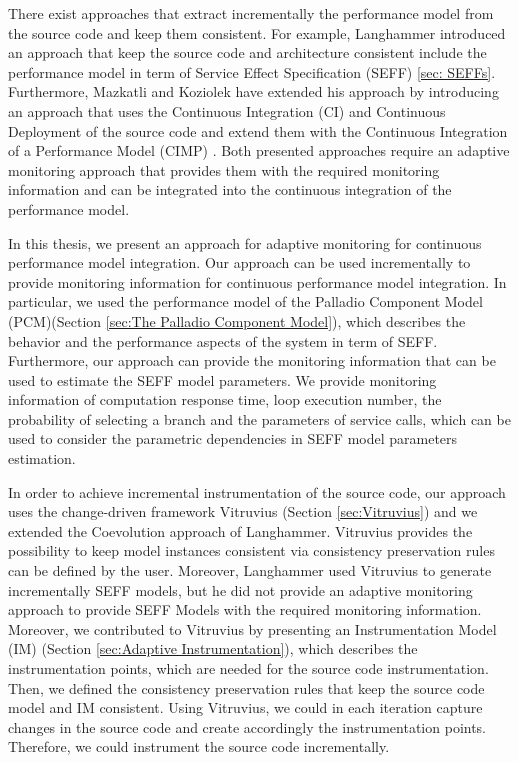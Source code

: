 There exist approaches that extract incrementally the performance model from the source code and keep them consistent. For example, Langhammer introduced an approach \cite{langhammer2017automated} that keep the source code and architecture consistent include the performance model in term of Service Effect Specification (SEFF) \ref{sec: SEFFs}. Furthermore, Mazkatli and Koziolek have extended his approach by introducing an approach that uses the Continuous Integration (CI) and Continuous Deployment of the source code and extend them with the Continuous Integration of a Performance Model (CIMP) \cite{mazkatli2018continuous}. Both presented approaches require an adaptive monitoring approach that provides them with the required monitoring information and can be integrated into the continuous integration of the performance model. 

In this thesis, we present an approach for adaptive monitoring for continuous performance model integration. Our approach can be used incrementally to provide monitoring information for continuous performance model integration. In particular, we used the performance model of the Palladio Component Model (PCM)(Section \ref{sec:The Palladio Component Model}), which describes the behavior and the performance aspects of the system in term of SEFF. Furthermore, our approach can provide the monitoring information that can be used to estimate the SEFF model parameters. We provide monitoring information of computation response time, loop execution number, the probability of selecting a branch and the parameters of service calls, which can be used to consider the parametric dependencies in SEFF model parameters estimation.

In order to achieve incremental instrumentation of the source code, our approach uses the change-driven framework Vitruvius (Section \ref{sec:Vitruvius}) and we extended the Coevolution approach \cite{langhammer2017automated} of Langhammer. Vitruvius provides the possibility to keep model instances consistent via consistency preservation rules can be defined by the user. Moreover, Langhammer used Vitruvius to generate incrementally SEFF models, but he did not provide an adaptive monitoring approach to provide SEFF Models with the required monitoring information. Moreover, we contributed to Vitruvius by presenting an Instrumentation Model (IM) (Section \ref{sec:Adaptive Instrumentation}), which describes the instrumentation points, which are needed for the source code instrumentation. Then, we defined the consistency preservation rules that keep the source code model and IM consistent. Using Vitruvius, we could in each iteration capture changes in the source code and create accordingly the instrumentation points. Therefore, we could instrument the source code incrementally. 

